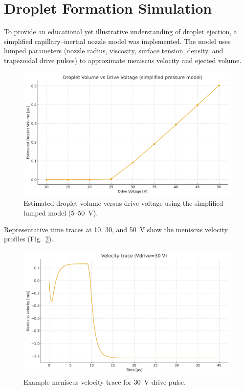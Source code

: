 \section{Droplet Formation Simulation}

To provide an educational yet illustrative understanding of droplet ejection,
a simplified capillary–inertial nozzle model was implemented.
The model uses lumped parameters (nozzle radius, viscosity, surface tension,
density, and trapezoidal drive pulses) to approximate meniscus velocity
and ejected volume.

\begin{figure}[htbp]
  \centering
  \includegraphics[width=0.9\linewidth]{figs/droplet_volume_vs_voltage.png}
  \caption{Estimated droplet volume versus drive voltage
  using the simplified lumped model (5--50~V).}
  \label{fig:voltage_vs_volume}
\end{figure}

Representative time traces at 10, 30, and 50~V show the meniscus velocity
profiles (Fig.~\ref{fig:vel_traces}).

\begin{figure}[htbp]
  \centering
  \includegraphics[width=0.9\linewidth]{figs/velocity_trace_30V.png}
  \caption{Example meniscus velocity trace for 30~V drive pulse.}
  \label{fig:vel_traces}
\end{figure}
